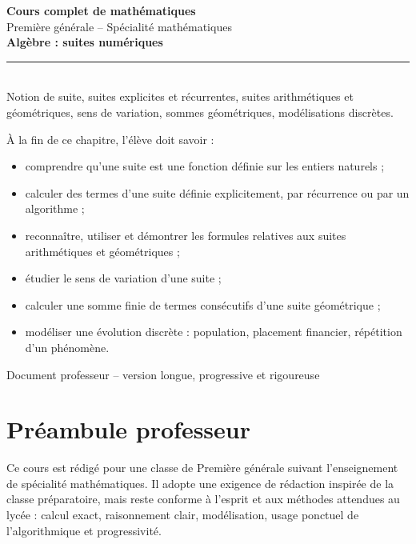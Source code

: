 \documentclass[11pt,a4paper]{article}
\begin{document}
\begin{titlepage}
\centering
\vspace*{1.5cm}
{\Huge\bfseries Cours complet de mathématiques\\[0.2cm]}
{\LARGE Première générale -- Spécialité mathématiques\\[0.8cm]}
{\Huge\color{bleuprepa}\bfseries Algèbre : suites numériques\\[0.4cm]}
\rule{0.8\textwidth}{0.5pt}\\[0.6cm]
{\Large Notion de suite, suites explicites et récurrentes, suites arithmétiques et géométriques, sens de variation, sommes géométriques, modélisations discrètes.}\\[1cm]
\begin{tcolorbox}[colframe=bleuprepa,colback=blue!2!white,width=0.9\textwidth,title=Objectifs du chapitre]
À la fin de ce chapitre, l'élève doit savoir :
\begin{itemize}
  \item comprendre qu'une suite est une fonction définie sur les entiers naturels ;
  \item calculer des termes d'une suite définie explicitement, par récurrence ou par un algorithme ;
  \item reconnaître, utiliser et démontrer les formules relatives aux suites arithmétiques et géométriques ;
  \item étudier le sens de variation d'une suite ;
  \item calculer une somme finie de termes consécutifs d'une suite géométrique ;
  \item modéliser une évolution discrète : population, placement financier, répétition d'un phénomène.
\end{itemize}
\end{tcolorbox}
\vfill
{\large Document professeur -- version longue, progressive et rigoureuse}\par
\end{titlepage}

\tableofcontents
\newpage

\section*{Préambule professeur}
Ce cours est rédigé pour une classe de Première générale suivant l'enseignement de spécialité mathématiques. Il adopte une exigence de rédaction inspirée de la classe préparatoire, mais reste conforme à l'esprit et aux méthodes attendues au lycée : calcul exact, raisonnement clair, modélisation, usage ponctuel de l'algorithmique et progressivité.
\end{document}
